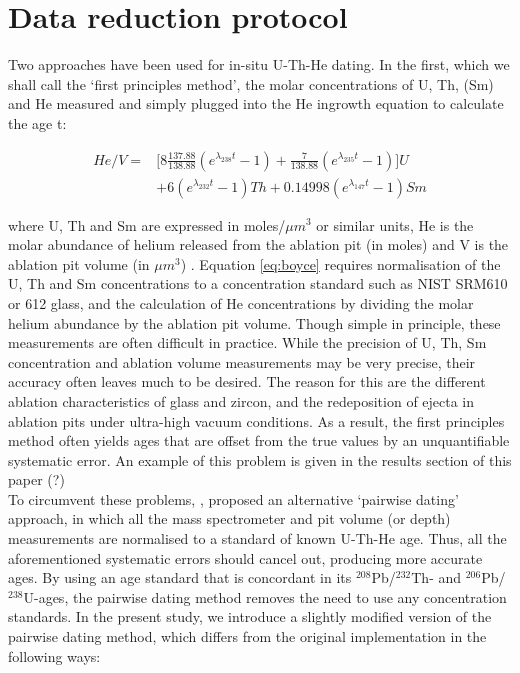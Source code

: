 \documentclass{article}
\begin{document}
\section*{Data reduction protocol}

Two approaches have been used for in-situ U-Th-He dating. In the
first, which we shall call the `first principles method', the molar
concentrations of U, Th, (Sm) and He measured and simply plugged into
the He ingrowth equation to calculate the age t:

\begin{equation}
\begin{array}{rl}
He/V = & \Big[ 8 \frac{137.88}{138.88} (e^{\lambda_{238}t}-1) + 
\frac{7}{138.88} (e^{\lambda_{235}t}-1)\Big] U \\ 
~ & + 6 (e^{\lambda_{232}t}-1) Th + 0.1499 8 (e^{\lambda_{147}t}-1) Sm 
\end{array}
\label{eq:boyce}
\end{equation}

where U, Th and Sm are expressed in moles/$\mu m^3$ or similar units,
He is the molar abundance of helium released from the ablation pit (in
moles) and V is the ablation pit volume (in $\mu m^3$)
\citep{boyce2006}. Equation \ref{eq:boyce} requires normalisation of
the U, Th and Sm concentrations to a concentration standard such as
NIST SRM610 or 612 glass, and the calculation of He concentrations by
dividing the molar helium abundance by the ablation pit volume. Though
simple in principle, these measurements are often difficult in
practice. While the precision of U, Th, Sm concentration and ablation
volume measurements may be very precise, their accuracy often leaves
much to be desired. The reason for this are the different ablation
characteristics of glass and zircon, and the redeposition of ejecta in
ablation pits under ultra-high vacuum conditions. As a result, the
first principles method often yields ages that are offset from the
true values by an unquantifiable systematic error. An example of this
problem is given in the results section of this paper (?)\\

To circumvent these problems, \citet{vermeesch2012a}, proposed an
alternative `pairwise dating' approach, in which all the mass
spectrometer and pit volume (or depth) measurements are normalised to
a standard of known U-Th-He age. Thus, all the aforementioned
systematic errors should cancel out, producing more accurate ages.  By
using an age standard that is concordant in its $^{208}$Pb/$^{232}$Th-
and $^{206}$Pb/$^{238}$U-ages, the pairwise dating method removes the
need to use any concentration standards. In the present study, we
introduce a slightly modified version of the pairwise dating method,
which differs from the original implementation in the following ways:
\end{document}
